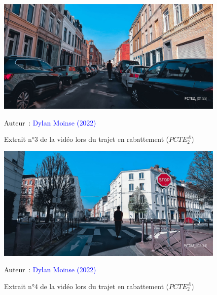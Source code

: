     \begin{figure}[h!]\vspace*{4pt}
        \caption*{Extrait n°3 de la vidéo lors du trajet en rabattement (\(PCTE^{A}_{2}\))}
        \centerline{\includegraphics[width=0.75\columnwidth]{src/Figures/Annexes/Extrait_Video_PCTE2_Access_3.jpg}}
        \vspace{5pt}
        \begin{flushright}\scriptsize{
        Auteur~: \textcolor{blue}{Dylan Moinse (2022)}
        }\end{flushright}
    \end{figure}

    \begin{figure}[h!]\vspace*{4pt}
        \caption*{Extrait n°4 de la vidéo lors du trajet en rabattement (\(PCTE^{A}_{2}\))}
        \centerline{\includegraphics[width=0.75\columnwidth]{src/Figures/Annexes/Extrait_Video_PCTE2_Access_4.jpg}}
        \vspace{5pt}
        \begin{flushright}\scriptsize{
        Auteur~: \textcolor{blue}{Dylan Moinse (2022)}
        }\end{flushright}
    \end{figure}

